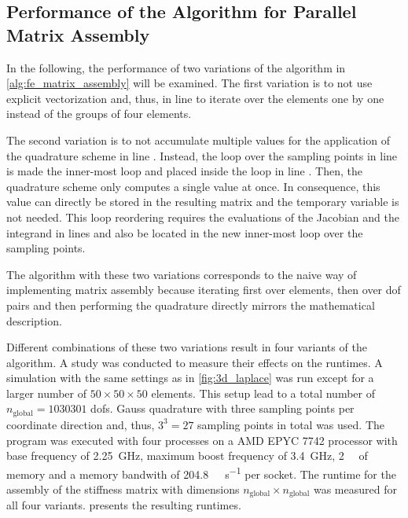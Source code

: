 
\subsection{Performance of the Algorithm for Parallel Matrix Assembly}\label{sec:performance_of_the_algorithm_for_pma}

In the following, the performance of two variations of the algorithm in \cref{alg:fe_matrix_assembly} will be examined. The first variation is to not use explicit vectorization and, thus, in line  to iterate over the elements one by one instead of the groups of four elements.

The second variation is to not accumulate multiple values for the application of the quadrature scheme in line . Instead, the loop over the sampling points in line  is made the inner-most loop and placed inside  the loop in line . Then, the quadrature scheme only computes a single value at once. In consequence, this value can directly be stored in the resulting matrix and the temporary variable  is not needed. This loop reordering requires the evaluations of the Jacobian and the integrand in lines  and  also be located in the new inner-most loop over the sampling points. 

The algorithm with these two variations corresponds to the naive way of implementing matrix assembly because iterating first over elements, then over dof pairs and then performing the quadrature directly mirrors the mathematical description.

Different combinations of these two variations result in four variants of the algorithm. A study was conducted to measure their effects on the runtimes. A simulation with the same settings as in \cref{fig:3d_laplace} was run except for a larger number of $50 \times 50 \times 50$ elements. This setup lead to a total number of $n_\text{global}=\num{1030301}$ dofs. Gauss quadrature with three sampling points per coordinate direction and, thus, $3^3=27$ sampling points in total was used. The program was executed with four processes on a AMD EPYC 7742 processor with base frequency of \SI{2.25}{\giga\hertz}, maximum boost frequency of \SI{3.4}{\giga\hertz}, \SI{2}{\tera\byte} of memory and a memory bandwith of \SI{204.8}{\giga\byte\per\second} per socket.
The runtime for the assembly of the stiffness matrix with dimensions $n_\text{global} \times n_\text{global}$ was measured for all four variants.  presents the resulting runtimes.

